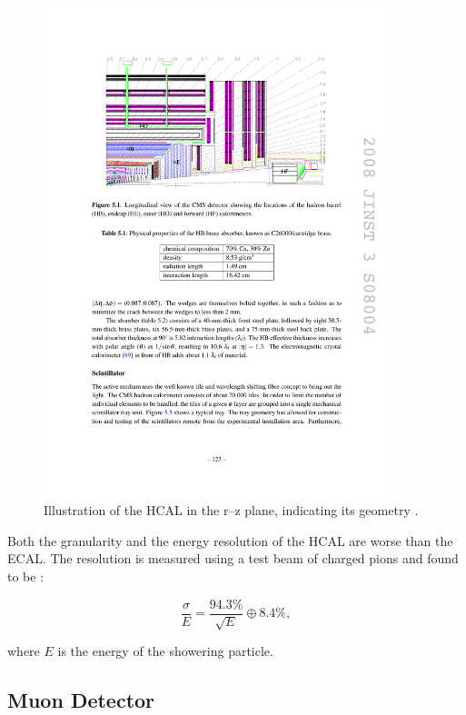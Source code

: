 \begin{figure}[htbp]
   \includegraphics[width=0.9\textwidth]{plots/detector/hcal_layout.pdf}
\caption[Illustration of the HCAL in the r--z plane, indicating its
geometry.]
{Illustration of the \ac{HCAL} in the r--z plane, indicating its geometry \cite{Chatrchyan:2008aa}.}
\label{fig:hcal}
\end{figure}

Both the granularity and the energy resolution of the \ac{HCAL} are worse than
the \ac{ECAL}. The resolution is measured using a test beam of charged pions and
found to be \cite{Abdullin:2009zz}:

\begin{equation}
\frac{\sigma}{E} = \frac{94.3\%}{\sqrt{E}} \oplus 8.4\%,
\end{equation}

where $E$ is the energy of the showering particle. 

\subsection{Muon Detector}
\label{sec:muondetector}

